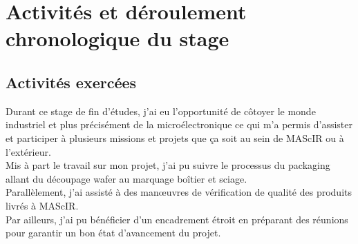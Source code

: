 \documentclass[11pt, a4paper, twoside]{book}
\begin{document}
\section{Activités et déroulement chronologique du stage}
\subsection{Activités exercées}
Durant ce stage de fin d’études, j’ai eu l’opportunité de côtoyer le monde industriel et plus précisément de la microélectronique ce qui m’a permis d’assister et participer à plusieurs missions et projets que ça soit au sein de MAScIR ou à l’extérieur.\\

Mis à part le travail sur mon projet, j’ai pu suivre le processus du packaging allant du découpage wafer au marquage boîtier et sciage.\\

Parallèlement, j’ai assisté à des manœuvres de vérification de qualité des produits livrés à MAScIR.\\

Par ailleurs, j’ai pu bénéficier d’un encadrement étroit en préparant des réunions pour garantir un bon état d’avancement du projet.
\end{document}
